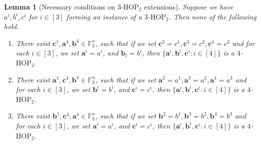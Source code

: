 \documentclass[12pt,oneside,british,a4wide]{amsart}
\newtheorem{lemma}[theorem]{Lemma}
\numberwithin{equation}{section}
\theoremstyle{definition}
\def\F{\mathbb{F}}
\def\HOP{\mathrm{HOP}}
\begin{document}
\begin{lemma}[Necessary conditions on $3$-$\HOP_2$ extensions]\label{lem:3hopfact}
Suppose we have $a^i, b^i, c^i$ for $i\in [3]$ forming an instance of a $3$-$\HOP_2$.  Then none of the following hold.
\begin{enumerate}[label=\normalfont(\arabic*)]
\item There exist $\mathbf{c}^1,\mathbf{a}^4,\mathbf{b}^4\in \F_3^n$, such that if we set $\mathbf{c}^2=c^1,\mathbf{c}^3=c^2, \mathbf{c}^4=c^3$ and for each $i\in [3]$, we set $\mathbf{a}^i=a^i$, and $\mathbf{b}_i=b^i$, then $\{\mathbf{a}^i,\mathbf{b}^i,\mathbf{c}^i: i\in [4]\}$ is a $4$-$\HOP_2$.
\item There exist $\mathbf{a}^1,\mathbf{c}^4,\mathbf{b}^4\in \F_3^n$, such that if we set $\mathbf{a}^2=a^1,\mathbf{a}^3=a^2, \mathbf{a}^4=a^3$ and for each $i\in [3]$, we set $\mathbf{b}^i=b^i$, and $\mathbf{c}^i=c^i$, then $\{\mathbf{a}^i,\mathbf{b}^i,\mathbf{c}^i: i\in [4]\}$ is a $4$-$\HOP_2$.
\item There exist $\mathbf{b}^1,\mathbf{c}^4,\mathbf{a}^4\in \F_3^n$, such that if we set $\mathbf{b}^2=b^1,\mathbf{b}^3=b^2, \mathbf{b}^4=b^3$ and for each $i\in [3]$, we set $\mathbf{a}^i=a^i$, and $\mathbf{c}^i=c^i$, then $\{\mathbf{a}^i,\mathbf{b}^i,\mathbf{c}^i: i\in [4]\}$ is a $4$-$\HOP_2$.
\end{enumerate} 
\end{lemma}
\end{document}

